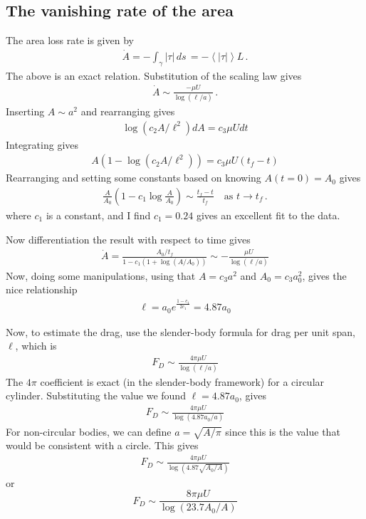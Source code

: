 \documentclass[11pt]{article}
\newcommand{\abs}[1]{\left| #1 \right|}
\newcommand{\mean}[1]{\left< #1 \right>}
\newcommand{\atau}{\abs{\tau}}
\begin{document}
\subsection{The vanishing rate of the area}

The area loss rate is given by
\begin{align}
\dot{A} = - \int_{\gamma} \atau \, ds \,  = - \mean{\atau} L \, .
\end{align}
The above is an exact relation. Substitution of the scaling law gives
\begin{align}
\dot{A} \sim \frac{ - \mu U}{\log(\ell/a)} \, .
\end{align}
Inserting $A \sim a^2$ and rearranging gives
\begin{align}
\log (c_2 A/\ell^2) dA = c_3 \mu U dt
\end{align}
Integrating gives
\begin{align}
A \left(1 - \log(c_2 A/\ell^2) \right) = c_3 \mu U (t_f - t)
\end{align}
Rearranging and setting some constants based on knowing $A(t=0) = A_0$ gives
\begin{align}
\label{area_predict}
\frac{A}{A_0} \left( 1 - c_1 \log{\frac{A}{A_0}} \right) \sim \frac{t_f - t}{t_f} \quad \text{as } t \to t_f \, .
\end{align}
where $c_1$ is a constant, and I find $c_1 = 0.24$ gives an excellent fit to the data.

Now differentiation the result with respect to time gives
\begin{align}
\dot{A} = \frac{A_0/t_f}{1 - c_1 (1 + \log(A/A_0))} \sim - \frac{\mu U}{\log(\ell / a)}
\end{align}
Now, doing some manipulations, using that $A = c_3 a^2$ and $A_0 = c_3 a_0^2$, gives the nice relationship
\begin{align}
\ell = a_0 e^{\frac{1-c_1}{2 c_1}} = 4.87 a_0 
\end{align}

Now, to estimate the drag, use the slender-body formula for drag per unit span, $\ell$, which is
\begin{align}
F_D \sim \frac{4 \pi \mu U}{\log(\ell/a)}
\end{align}
The $4 \pi$ coefficient is exact (in the slender-body framework) for a circular cylinder. Substituting the value we found $\ell = 4.87 a_0$, gives
\begin{align}
F_D \sim \frac{4 \pi \mu U}{\log(4.87 a_0/a)}
\end{align}
For non-circular bodies, we can define $a = \sqrt{A/\pi}$ since this is the value that would be consistent with a circle. This gives
\begin{align}
F_D \sim \frac{4 \pi \mu U}{\log(4.87 \sqrt{A_0/A})}
\end{align}
or
\begin{equation}
F_D \sim \frac{8 \pi \mu U}{\log(23.7 A_0/A)}
\end{equation}
\end{document}
